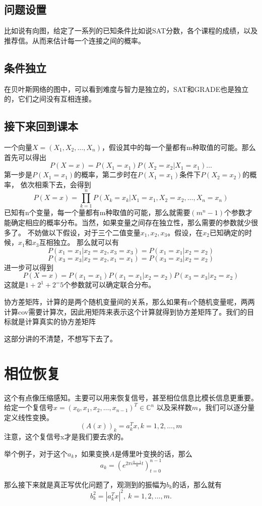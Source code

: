 \documentclass{article}
\begin{document}
\subsection{问题设置}
比如说有向图，给定了一系列的已知条件比如说SAT分数，各个课程的成绩，以及推荐信。从而来估计每一个连接之间的概率。
\subsection{条件独立}
在贝叶斯网络的图中，可以看到难度与智力是独立的，SAT和GRADE也是独立的，它们之间没有互相连接。
\subsection{接下来回到课本}
一个向量$X=(X_1,X_2,\dots,X_n)$，假设其中的每一个量都有m种取值的可能。那么首先可以得出
$$
P(X=x)
=P(X_1=x_1)P(X_2=x_2|X_1=x_1)\dots
$$
第一步是$P(X_1=x_1)$的概率，第二步时在$P(X_1=x_1)$条件下$P(X_2=x_2)$的概率，
依次相乘下去，会得到
$$
P(X=x)=\prod\limits_{k=1}^n P(X_k=x_k|X_1=x_1,X_2=x_2,\dots,X_n=x_n)
$$
已知有n个变量，每一个量都有m种取值的可能，那么就需要$(m^n-1)$个参数才能确定相应的概率分布。当然，如果变量之间存在独立性，那么需要的参数就少很多了。
不妨做以下假设，对于三个二值变量$x_1,x_2,x_3$。假设，在$x_2$已知确定的时候，$x_1$和$x_3$互相独立。
那么就可以有
$$
P(x_1=x_1|x_2=x_2,x_3=x_3)=P(x_1=x_1|x_2=x_2)
$$
$$
P(x_3=x_3|x_2=x_2,x_1=x_1)=P(x_3=x_3|x_2=x_2)
$$
进一步可以得到
$$
P(X=x)=P(x_1=x_1)P(x_1=x_1|x_2=x_2)P(x_3=x_3|x_2=x_2)
$$
这就是$1+2^1+2^=5$个参数就可以确定联合分布。

协方差矩阵，计算的是两个随机变量间的关系，那么如果有n个随机变量呢，两两计算cov需要计算次，因此用矩阵来表示这个计算就得到协方差矩阵了。我们的目标就是计算真实的协方差矩阵

这部分讲的不清楚，不想写下去了。
\section{相位恢复}
这个有点像压缩感知。主要可以用来恢复信号，甚至相位信息比模长信息更重要。
给定一个复信号$x=(x_0,x_1,x_2,\dots,x_{n-1})^T \in \mathbb{C}^n$
以及采样数$m$，我们可以逐分量定义线性变换。
$$(A(x))_k=a_k^T x, k=1,2,\dots,m$$
注意，这个复信号x才是我们要去求的。

举个例子，对于这个$a_k$，如果变换$A$是傅里叶变换的话，那么
$$a_k=(e^{2 \pi i \frac{k-1}{n}t})^{n-1}_{t=0}$$

那么接下来就是真正写优化问题了，观测到的振幅为$b_k$的话，那么就有
$$
b_k^2=|a_k^T x|^2,\ k=1,2,\dots,m.
$$
\end{document}
